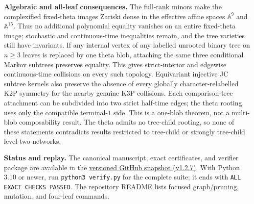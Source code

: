 \documentclass[10pt]{article}
\begin{document}
\textbf{Algebraic and all-leaf consequences.} The full-rank minors make the complexified fixed-theta images Zariski dense in the effective affine spaces $\mathbb A^9$ and $\mathbb A^{15}$. Thus no additional polynomial equality vanishes on an entire fixed-theta image; stochastic and continuous-time inequalities remain, and the tree varieties still have invariants. If any internal vertex of any labelled unrooted binary tree on $n\ge3$ leaves is replaced by one theta blob, attaching the same three conditional Markov subtrees preserves equality. This gives strict-interior and edgewise continuous-time collisions on every such topology. Equivariant injective JC subtree kernels also preserve the absence of every globally character-relabelled K2P symmetry for the nearby genuine K3P collisions. Each comparison-tree attachment can be subdivided into two strict half-time edges; the theta rooting uses only the compatible terminal-$1$ side. This is a one-blob theorem, not a multi-blob composability result. The theta admits no tree-child rooting, so none of these statements contradicts results restricted to tree-child or strongly tree-child level-two networks.

\textbf{Status and replay.} The canonical manuscript, exact certificates, and verifier package are available in the \href{https://github.com/AlecKriebel/Math/tree/k2p-k3p-theta-v1.2.7/k2p_k3p_theta_trinet_collision/k2p_k3p_theta_clarified}{versioned GitHub snapshot (v1.2.7)}. With Python 3.10 or newer, run \texttt{python3 verify.py} for the complete suite; it ends with \texttt{ALL EXACT CHECKS PASSED}. The repository README lists focused graph/pruning, mutation, and four-leaf commands.
\end{document}

